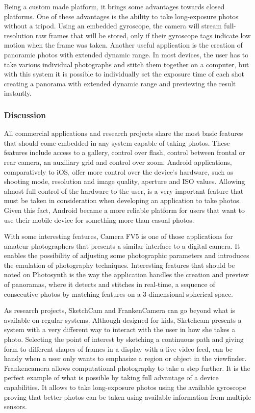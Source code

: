 Being a custom made platform, it brings some advantages towards closed platforms. One of these advantages is the ability to take long-exposure photos without a tripod. Using an embedded gyroscope, the camera will stream full-resolution raw frames that will be stored, only if their gyroscope tags indicate low motion when the frame was taken. 
Another useful application is the creation of panoramic photos with extended dynamic range. In most devices, the user has to take various individual photographs and stitch them together on a computer, but with this system it is possible to individually set the exposure time of each shot creating a panorama with extended dynamic range and previewing the result instantly.

\subsubsection{Discussion}

All commercial applications and research projects share the most basic features that should come embedded in any system capable of taking photos. These features include access to a gallery, control over flash, control between frontal or rear camera, an auxiliary grid and control over zoom.
Android applications, comparatively to iOS, offer more control over the device's hardware, such as shooting mode, resolution and image quality, aperture and ISO values. Allowing almost full control of the hardware to the user, is a very important feature that must be taken in consideration when developing an application to take photos. Given this fact, Android became a more reliable platform for users that want to use their mobile device for something more than casual photos.

With some interesting features, Camera FV5  is one of those applications for amateur photographers that presents a similar interface to a digital camera. It enables the possibility of adjusting some photographic parameters and introduces the emulation of photography techniques.
Interesting features that should be noted on Photosynth is the way the application handles the creation and preview of panoramas, where it detects and stitches in real-time, a sequence of consecutive photos by matching features on a 3-dimensional spherical space.

As research projects, SketchCam and FrankenCamera can go beyond what is available on regular systems. Although designed for kids, Sketchcam presents a system with a very different way to interact with the user in how she takes a photo. Selecting the point of interest by sketching a continuous path and giving form to different shapes of frames in a display with a live video feed, can be handy when a user only wants to emphasize a region or object in the viewfinder.
Frankencamera allows computational photography to take a step further. It is the perfect example of what is possible by taking full advantage of a device capabilities. It allows to take long-exposure photos using the available gyroscope proving that better photos can be taken using available information from multiple sensors.


